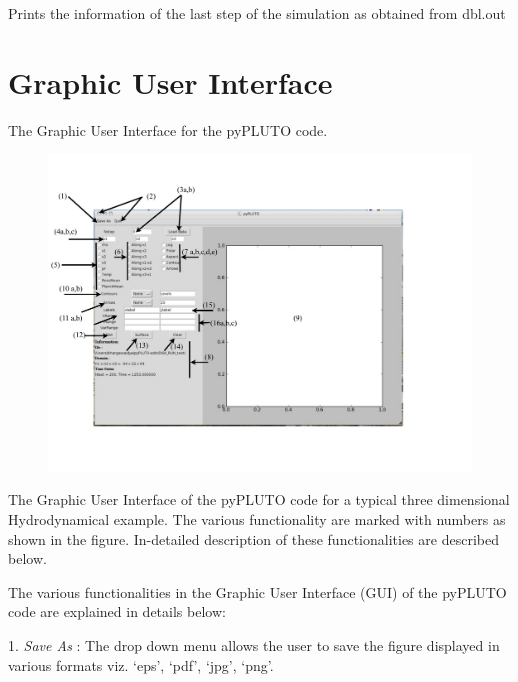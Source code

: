 \documentclass[letterpaper,10pt,english]{sphinxmanual}
\begin{document}

\begin{fulllineitems}
\label{index:pyPLUTO.nlast_info}
Prints the information of the last step of the simulation as obtained from dbl.out

\end{fulllineitems}



\chapter{Graphic User Interface}
\label{index:graphic-user-interface}
The Graphic User Interface for the pyPLUTO code.
\begin{figure}[htbp]
\centering

\includegraphics{GetStarted.pdf}
\end{figure}

The Graphic User Interface of the pyPLUTO code for a typical
three dimensional Hydrodynamical example. The various functionality
are marked with numbers as shown in the figure. In-detailed
description of these functionalities are described below.

The various functionalities in the Graphic User Interface (GUI) of the
pyPLUTO code are explained in details below:

1. \emph{Save As} : The drop down menu allows the user to save the figure
displayed in various
formats viz. `eps', `pdf', `jpg', `png'.
\end{document}
